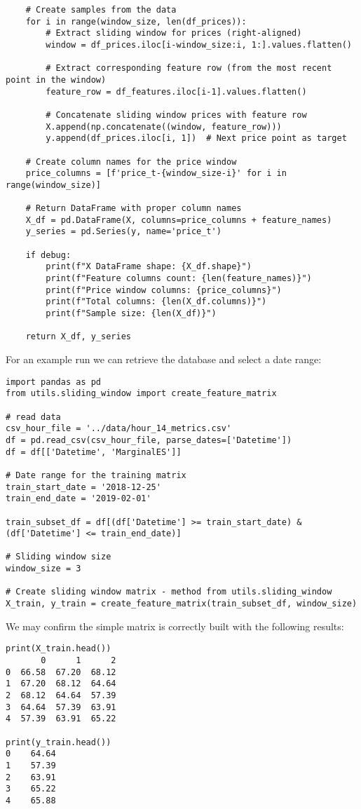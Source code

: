 \documentclass[12pt]{report} %
\begin{document}
\begin{lstlisting}
    # Create samples from the data
    for i in range(window_size, len(df_prices)):
        # Extract sliding window for prices (right-aligned)
        window = df_prices.iloc[i-window_size:i, 1:].values.flatten()
        
        # Extract corresponding feature row (from the most recent point in the window)
        feature_row = df_features.iloc[i-1].values.flatten()
        
        # Concatenate sliding window prices with feature row
        X.append(np.concatenate((window, feature_row)))
        y.append(df_prices.iloc[i, 1])  # Next price point as target
    
    # Create column names for the price window
    price_columns = [f'price_t-{window_size-i}' for i in range(window_size)]
    
    # Return DataFrame with proper column names
    X_df = pd.DataFrame(X, columns=price_columns + feature_names)
    y_series = pd.Series(y, name='price_t')
    
    if debug:
        print(f"X DataFrame shape: {X_df.shape}")
        print(f"Feature columns count: {len(feature_names)}")
        print(f"Price window columns: {price_columns}")
        print(f"Total columns: {len(X_df.columns)}")
        print(f"Sample size: {len(X_df)}")
    
    return X_df, y_series
\end{lstlisting}

For an example run we can retrieve the database and select a date range:
\begin{lstlisting}
import pandas as pd
from utils.sliding_window import create_feature_matrix

# read data
csv_hour_file = '../data/hour_14_metrics.csv'
df = pd.read_csv(csv_hour_file, parse_dates=['Datetime'])
df = df[['Datetime', 'MarginalES']]

# Date range for the training matrix
train_start_date = '2018-12-25'
train_end_date = '2019-02-01'

train_subset_df = df[(df['Datetime'] >= train_start_date) & (df['Datetime'] <= train_end_date)]

# Sliding window size
window_size = 3

# Create sliding window matrix - method from utils.sliding_window
X_train, y_train = create_feature_matrix(train_subset_df, window_size)
\end{lstlisting}

We may confirm the simple matrix is correctly built with the following results:
\begin{small}
\begin{verbatim}
print(X_train.head())
       0      1      2
0  66.58  67.20  68.12
1  67.20  68.12  64.64
2  68.12  64.64  57.39
3  64.64  57.39  63.91
4  57.39  63.91  65.22

print(y_train.head())
0    64.64
1    57.39
2    63.91
3    65.22
4    65.88
\end{verbatim}
\end{small}
\end{document}
